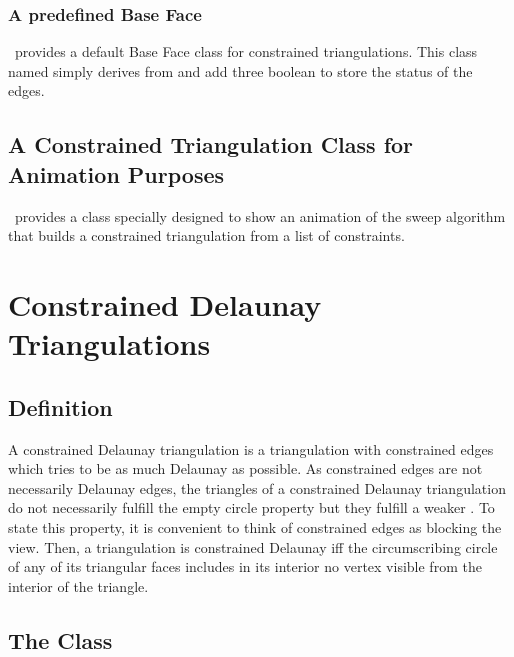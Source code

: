 \subsubsection{A predefined Base Face}
\cgal\ provides a default Base Face class
for constrained triangulations. This class named
simply derives from 
and add three boolean to store the status of the edges. 


\subsection{A Constrained Triangulation Class for Animation Purposes
\label{I1_Subsec_Constrained_Demo_2}}

\cgal\ provides 
a class  
specially designed to show an animation of the sweep algorithm 
that builds a 
constrained triangulation from a list of constraints.



\section{Constrained Delaunay Triangulations}
\label{I1_Sect_Constrained_Delaunay_Triangulations}

\subsection{Definition}
A constrained Delaunay triangulation is a triangulation with
constrained edges which tries to be as much Delaunay as possible.
As constrained edges are not necessarily Delaunay edges,
the triangles of a constrained Delaunay triangulation do not
necessarily fulfill the empty circle property
but they fulfill a weaker .
 To state this property,
it is convenient to think of  constrained
edges as blocking the view. Then, a triangulation is 
constrained Delaunay iff
 the circumscribing circle
of any of its triangular faces includes in its interior 
no vertex  visible
from the interior of the triangle.

\subsection{The Class 
\protect {}}

